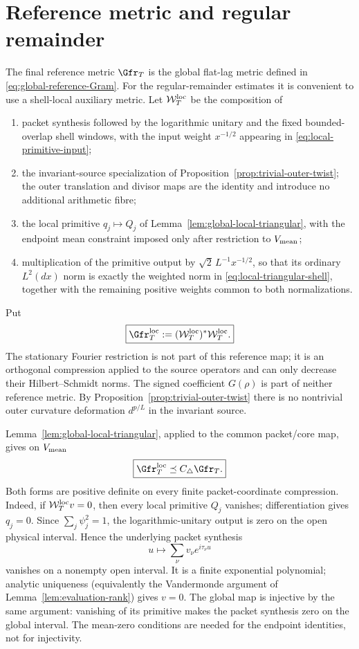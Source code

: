 \section{Reference metric and regular remainder}
\label{sec:ledger}

The final reference metric $\Gfr_T$ is the global flat-lag metric defined in
\eqref{eq:global-reference-Gram}. For the regular-remainder estimates it is
convenient to use a shell-local auxiliary metric. Let
$\mathcal W_T^{\rm loc}$ be the composition of
\begin{enumerate}[label=(\roman*)]
\item packet synthesis followed by the logarithmic unitary and the fixed
bounded-overlap shell windows, with the input weight $x^{-1/2}$ appearing in
\eqref{eq:local-primitive-input};
\item the invariant-source specialization of
Proposition~\ref{prop:trivial-outer-twist}; the outer translation and divisor
maps are the identity and introduce no additional arithmetic fibre;
\item the local primitive $q_j\mapsto Q_j$ of
Lemma~\ref{lem:global-local-triangular}, with the endpoint mean constraint imposed
only after restriction to $V_{\rm mean}$;
\item multiplication of the primitive output by
$\sqrt2\,L^{-1}x^{-1/2}$, so that its ordinary $L^2(dx)$ norm is exactly the
weighted norm in \eqref{eq:local-triangular-shell}, together with the remaining
positive weights common to both normalizations.
\end{enumerate}
Put
\begin{equation}
\boxed{
\Gfr_T^{\rm loc}:=(\mathcal W_T^{\rm loc})^*\mathcal W_T^{\rm loc}.
}
\label{eq:local-reference-Gram}
\end{equation}
The stationary Fourier restriction is not part of this reference map; it is an
orthogonal compression applied to the source operators and can only decrease
their Hilbert--Schmidt norms. The signed coefficient $G(\rho)$ is part of neither reference metric. By
Proposition~\ref{prop:trivial-outer-twist} there is no nontrivial outer
curvature deformation $d^{p/L}$ in the invariant source.

Lemma~\ref{lem:global-local-triangular}, applied to the common packet/core map,
gives on $V_{\rm mean}$
\begin{equation}
\boxed{
\Gfr_T^{\rm loc}\preceq C_\triangle\Gfr_T.
}
\label{eq:local-global-Gram-comparison}
\end{equation}
Both forms are positive definite on every finite packet-coordinate compression.
Indeed, if $\mathcal W_T^{\rm loc}v=0$, then every local primitive $Q_j$
vanishes; differentiation gives $q_j=0$. Since $\sum_j\psi_j^2=1$, the
logarithmic-unitary output is zero on the open physical interval. Hence the
underlying packet synthesis
\[
u\longmapsto \sum_\nu v_\nu e^{i\tau_\nu u}
\]
vanishes on a nonempty open interval. It is a finite exponential polynomial;
analytic uniqueness (equivalently the Vandermonde argument of
Lemma~\ref{lem:evaluation-rank}) gives $v=0$. The global map is injective by the
same argument: vanishing of its primitive makes the packet synthesis zero on
the global interval. The mean-zero conditions are needed for the endpoint
identities, not for injectivity.

